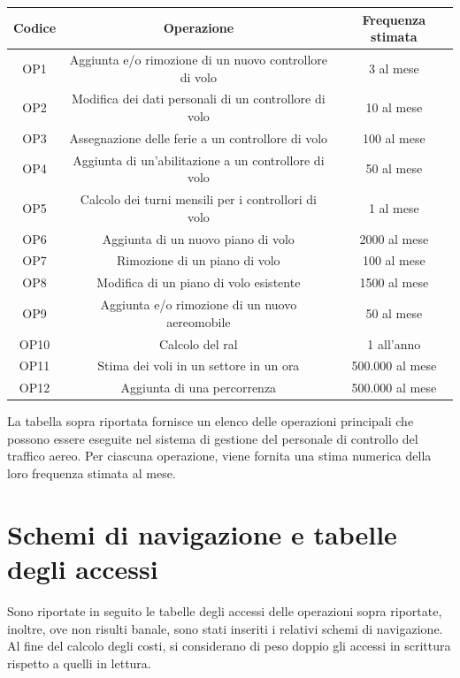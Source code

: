   \begin{table}[H]
  \centering
  \begin{tabular}{|c|c|c|}
  \hline
  \rowcolor{green!70!black!80}
  \textbf{Codice} & \textbf{Operazione} & \textbf{Frequenza stimata} \\
  \hline
  OP1 & Aggiunta e/o rimozione di un nuovo controllore di volo & 3 al mese \\
  OP2 & Modifica dei dati personali di un controllore di volo & 10 al mese \\
  OP3 & Assegnazione delle ferie a un controllore di volo & 100 al mese \\
  OP4 & Aggiunta di un'abilitazione a un controllore di volo & 50 al mese \\
  OP5 & Calcolo dei turni mensili per i controllori di volo & 1 al mese \\
  OP6 & Aggiunta di un nuovo piano di volo & 2000 al mese \\
  OP7 & Rimozione di un piano di volo & 100 al mese \\
  OP8 & Modifica di un piano di volo esistente & 1500 al mese \\
  OP9 & Aggiunta e/o rimozione di un nuovo aereomobile & 50 al mese \\
  OP10 & Calcolo del ral & 1 all'anno \\
  OP11 & Stima dei voli in un settore in un ora & 500.000 al mese \\
  OP12 & Aggiunta di una percorrenza & 500.000 al mese \\

  \hline
  \end{tabular}
  \end{table}
  
  La tabella sopra riportata fornisce un elenco delle operazioni principali che possono essere eseguite nel sistema di gestione del personale di controllo del traffico aereo. Per ciascuna operazione, viene fornita una stima numerica della loro frequenza stimata al mese.
\section{Schemi di navigazione e tabelle degli accessi}
Sono riportate in seguito le tabelle degli accessi delle operazioni sopra riportate, inoltre, ove
non risulti banale, sono stati inseriti i relativi schemi di navigazione. Al fine del calcolo degli
costi, si considerano di peso doppio gli accessi in scrittura rispetto a quelli in lettura.

